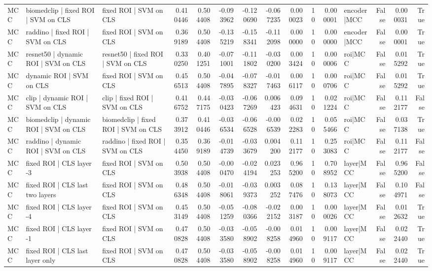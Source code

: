 \begin{table}
\begin{tabular}{lllrrrrrrrrlrrr}
MCC & biomedclip | fixed ROI | SVM on CLS & fixed ROI | SVM on CLS & 0.410446 & 0.504408 & -0.093962 & -0.120690 & -0.067235 & 0.000023 & 10 & 0.000001 & encoder|MCC & False & 0.000031 & True \\
MCC & raddino | fixed ROI | SVM on CLS & fixed ROI | SVM on CLS & 0.369189 & 0.504408 & -0.135219 & -0.158341 & -0.112098 & 0.000000 & 10 & 0.000000 & encoder|MCC & False & 0.000001 & True \\
MCC & resnet50 | dynamic ROI | SVM on CLS & resnet50 | fixed ROI | SVM on CLS & 0.330250 & 0.401251 & -0.071001 & -0.111802 & -0.030200 & 0.003424 & 10 & 0.000006 & roi|MCC & False & 0.015292 & True \\
MCC & dynamic ROI | SVM on CLS & fixed ROI | SVM on CLS & 0.456513 & 0.504408 & -0.047895 & -0.078327 & -0.017463 & 0.006117 & 10 & 0.000706 & roi|MCC & False & 0.015292 & True \\
MCC & clip | dynamic ROI | SVM on CLS & clip | fixed ROI | SVM on CLS & 0.416752 & 0.447175 & -0.030423 & -0.067269 & 0.006423 & 0.094631 & 10 & 0.021224 & roi|MCC & False & 0.112177 & False \\
MCC & biomedclip | dynamic ROI | SVM on CLS & biomedclip | fixed ROI | SVM on CLS & 0.373912 & 0.410446 & -0.036534 & -0.066528 & -0.006539 & 0.022283 & 10 & 0.055466 & roi|MCC & False & 0.037138 & True \\
MCC & raddino | dynamic ROI | SVM on CLS & raddino | fixed ROI | SVM on CLS & 0.354450 & 0.369189 & -0.014739 & -0.033679 & 0.004200 & 0.112177 & 10 & 0.253083 & roi|MCC & False & 0.112177 & False \\
MCC & fixed ROI | CLS layer -3 & fixed ROI | SVM on CLS & 0.503938 & 0.504408 & -0.000470 & -0.024194 & 0.023253 & 0.965200 & 10 & 0.708952 & layer|MCC & False & 0.965200 & False \\
MCC & fixed ROI | CLS last two layers & fixed ROI | SVM on CLS & 0.486348 & 0.504408 & -0.018061 & -0.039373 & 0.003252 & 0.087476 & 10 & 0.138073 & layer|MCC & False & 0.104971 & False \\
MCC & fixed ROI | CLS layer -4 & fixed ROI | SVM on CLS & 0.453149 & 0.504408 & -0.051259 & -0.080366 & -0.022152 & 0.003187 & 10 & 0.000026 & layer|MCC & False & 0.012632 & True \\
MCC & fixed ROI | CLS layer -1 & fixed ROI | SVM on CLS & 0.470828 & 0.504408 & -0.033580 & -0.058902 & -0.008258 & 0.014960 & 10 & 0.009117 & layer|MCC & False & 0.022440 & True \\
MCC & fixed ROI | CLS last layer only & fixed ROI | SVM on CLS & 0.470828 & 0.504408 & -0.033580 & -0.058902 & -0.008258 & 0.014960 & 10 & 0.009117 & layer|MCC & False & 0.022440 & True \\

\end{tabular}
\end{table}
